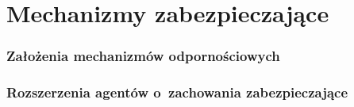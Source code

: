 \documentclass{beamer}
\begin{document}
\section{Mechanizmy zabezpieczające}
\begin{frame}
    \frametitle{Założenia mechanizmów odpornościowych}

\end{frame}

\begin{frame}
    \frametitle{Rozszerzenia agentów o~zachowania zabezpieczające}
    \begin{figure}[!ht]
    \end{figure}
\end{frame}
\end{document}
